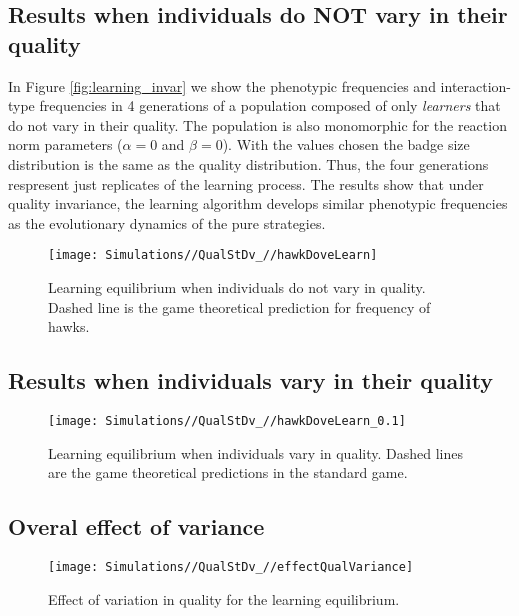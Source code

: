 \documentclass[]{article}
\begin{document}
\hypertarget{results-when-individuals-do-not-vary-in-their-quality}{%
\subsection{Results when individuals do NOT vary in their
quality}\label{results-when-individuals-do-not-vary-in-their-quality}}

In Figure \ref{fig:learning_invar} we show the phenotypic frequencies
and interaction-type frequencies in 4 generations of a population
composed of only \emph{learners} that do not vary in their quality. The
population is also monomorphic for the reaction norm parameters
(\(\alpha=0\) and \(\beta=0\)). With the values chosen the badge size
distribution is the same as the quality distribution. Thus, the four
generations respresent just replicates of the learning process. The
results show that under quality invariance, the learning algorithm
develops similar phenotypic frequencies as the evolutionary dynamics of
the pure strategies.

\begin{figure}
\texttt{[image: Simulations//QualStDv\_//hawkDoveLearn]} \caption{\label{fig:learning_invar}Learning equilibrium when individuals do not vary in quality. Dashed line is the  game theoretical prediction for frequency of hawks.}\label{fig:fig3}
\end{figure}

\hypertarget{results-when-individuals-vary-in-their-quality}{%
\subsection{Results when individuals vary in their
quality}\label{results-when-individuals-vary-in-their-quality}}

\begin{figure}
\texttt{[image: Simulations//QualStDv\_//hawkDoveLearn\_0.1]} \caption{\label{fig:learning_var0.1}Learning equilibrium when individuals vary in quality. Dashed lines are the  game theoretical predictions in the standard game.}\label{fig:fig4}
\end{figure}

\hypertarget{overal-effect-of-variance}{%
\subsection{Overal effect of variance}\label{overal-effect-of-variance}}

\begin{figure}
\texttt{[image: Simulations//QualStDv\_//effectQualVariance]} \caption{\label{fig:learning_all_var}Effect of variation in quality for the learning equilibrium.}\label{fig:fig5}
\end{figure}
\end{document}
